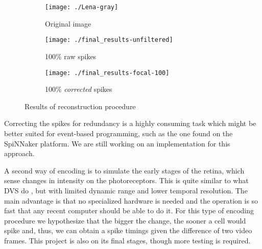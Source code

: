 \begin{figure}[hbt]
  \centering
  \begin{subfigure}[t]{0.15\textwidth}
    \centering
    \captionsetup{justification=centering,margin=0.1cm}
    \texttt{[image: ./Lena-gray]}
    \caption{Original image}
    \label{pic-original-lena}
  \end{subfigure}
  \begin{subfigure}[t]{0.15\textwidth}
    \centering
    \captionsetup{justification=centering,margin=0.1cm}
    \texttt{[image: ./final\_results-unfiltered]}
    \caption{100\% raw spikes}
    \label{pic-unfiltered-spikes}
  \end{subfigure}
  \begin{subfigure}[t]{0.15\textwidth}
    \centering
    \captionsetup{justification=centering,margin=0.1cm}
    \texttt{[image: ./final\_results-focal-100]}
    \caption{100\% \emph{corrected} spikes}
    \label{pic-100pc-spikes}
  \end{subfigure}
  \caption{Results of reconstruction procedure}
  \label{fig-reconstruction}
\end{figure}
Correcting the spikes for redundancy is a highly consuming task which might be 
better suited for event-based programming, such as the one found on the 
SpiNNaker platform. We are still working on an implementation for this 
approach.

A second way of encoding is to simulate the early stages of the retina, which
sense changes in intensity on the photoreceptors. This is quite similar to what 
DVS do \cite{aer-retina-bernabe, dvs-zurich}, but with limited dynamic range 
and lower temporal resolution. The main advantage is that no specialized 
hardware is needed and the operation is so fast that any recent computer should
be able to do it. For this type of encoding procedure we hypothesize that
the bigger the change, the sooner a cell would spike and, thus, we can obtain
a spike timings given the difference of two video frames. This project is also
on its final stages, though more testing is required.

